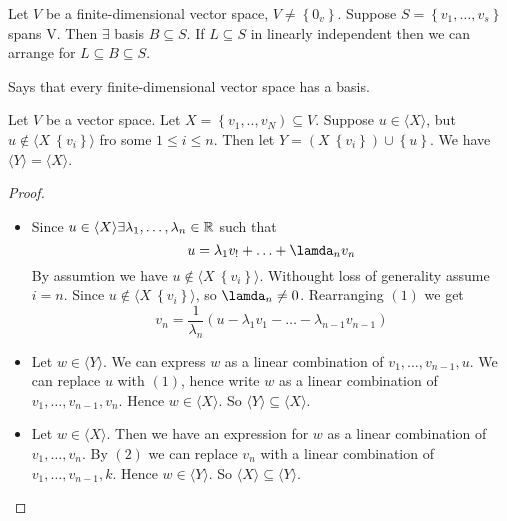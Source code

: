 \begin{prop}
	Let $V$ be a finite-dimensional vector space, $V \neq  \left\{ 0_{v} \right\} $. Suppose $S = \left\{ v_1,\ldots,v_s \right\} $ spans V. Then $\exists$ basis $B \subseteq S$. If $L \subseteq S$ in linearly independent then we can arrange for $L \subseteq B \subseteq S$. 
\end{prop}

\begin{remark}
	Says that every finite-dimensional vector space has a basis.
\end{remark}

\begin{lemma}
	Let $V$ be a vector space. Let $X = \left\{ v_1,..,v_N \right) \subseteq V$. Suppose $u \in \langle X \rangle$, but $u \not\in  \langle X \ \left\{ v_i \right\} \rangle $ fro some $1\le i\le n$. Then let $Y = \left( X \ \left\{ v_i \right\}  \right) \cup \left\{ u \right\} $. We have $\langle Y \rangle = \langle X \rangle$.
\end{lemma}

\begin{proof}
	\begin{itemize}
		\item Since $u \in \langle X\rangle \exists  \lambda_1,\ldots,\lambda_n \in \mathbb{R}$ such that
			\begin{equation}
				u = \lambda_1 v_! +\ldots+ \lamda_n v_n
			\end{equation}
			By assumtion we have $u \not\in \langle X \ \left\{ v_i  \right\} \rangle $. Withought loss of generality assume $i=n$. Since $u \not\in \langle X \ \left\{ v_i  \right\} \rangle $, so $\lamda_n \neq  0$. Rearranging $\left( 1 \right) $ we get
			\begin{equation}
				v_n = \frac{1}{\lambda_n} \left( u-\lambda_1 v_1 - \ldots - \lambda_{n-1} v_{n-1} \right) 
			\end{equation}
		\item Let $w \in \langle Y \rangle$. We can express $w$ as a linear combination of $v_1,\ldots,v_{n-1},u$. We can replace $u$ with $\left( 1 \right) $, hence write $w$ as a linear combination of $v_1,\ldots,v_{n-1},v_n$. Hence $w \in  \langle X \rangle$. So $\langle Y \rangle \subseteq \langle X \rangle$.
		\item Let $w \in \langle X \rangle$. Then we have an expression for $w$ as a linear combination of $v_1,\ldots,v_{n}$. By $\left( 2 \right) $ we can replace $v_n$ with a linear combination of $v_1,\ldots,v_{n-1},k$. Hence $w \in  \langle Y \rangle$. So $\langle X \rangle \subseteq \langle Y \rangle$.
	\end{itemize}
\end{proof}

